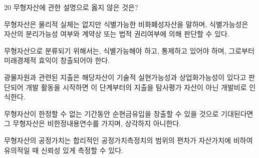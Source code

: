 \begin{question}{20}
무형자산에 관한 설명으로 옳지 않은 것은?
\begin{choices}
  \item 무형자산은 물리적 실체는 없지만 식별가능한 비화폐성자산을 말하며, 식별가능성은 자산의 분리가능성 여부와 계약상 또는 법적 권리여부에 의해 판단할 수 있다.
  \item 무형자산으로 분류되기 위해서는, 식별가능해야 하고, 통제하고 있어야 하며, 그로부터 미래경제적 효익이 창출되어야 한다.
  \item 광물자원과 관련된 지출은 해당자산이 기술적 실현가능성과 상업화가능성이 있다고 판단되어 개발 활동을 시작하면 이 단계부터의 지출을 탐사평가 자산이 아닌 개발비로 인식한다.
  \item 무형자산이 한정할 수 없는 기간동안 순현금유입을 창출할 수 있을 것으로 기대된다면 그 무형자산은 비한정내용연수를 가지며, 상각하지 아니한다.
  \item 무형자산의 공정가치는 합리적인 공정가치측정치의 범위의 편차가 자산가치에 비하여 유의적일 때 신뢰성 있게 측정할 수 있다.
\end{choices}
\end{question}

